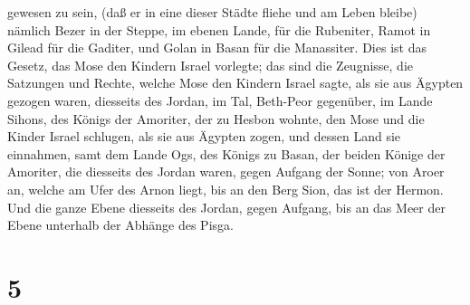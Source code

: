 gewesen zu sein, (daß er in eine dieser Städte fliehe und am Leben
bleibe)  nämlich Bezer in der Steppe, im ebenen Lande,
für die Rubeniter, Ramot in Gilead für die Gaditer, und Golan in Basan
für die Manassiter.  Dies ist das Gesetz, das Mose den
Kindern Israel vorlegte;  das sind die Zeugnisse, die
Satzungen und Rechte, welche Mose den Kindern Israel sagte, als sie aus
Ägypten gezogen waren,  diesseits des Jordan, im Tal,
Beth-Peor gegenüber, im Lande Sihons, des Königs der Amoriter, der zu
Hesbon wohnte, den Mose und die Kinder Israel schlugen, als sie aus
Ägypten zogen, und dessen Land sie einnahmen,  samt dem
Lande Ogs, des Königs zu Basan, der beiden Könige der Amoriter, die
diesseits des Jordan waren, gegen Aufgang der Sonne;  von
Aroer an, welche am Ufer des Arnon liegt, bis an den Berg Sion, das ist
der Hermon.  Und die ganze Ebene diesseits des Jordan,
gegen Aufgang, bis an das Meer der Ebene unterhalb der Abhänge des
Pisga.

\hypertarget{section-4}{%
\section{5}\label{section-4}}

